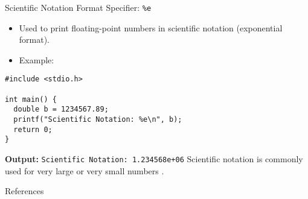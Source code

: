 \documentclass{beamer}
\begin{document}
\begin{frame}[fragile]{Scientific Notation Format Specifier: \texttt{\%e}}
  \begin{itemize}
    \item Used to print floating-point numbers in scientific notation (exponential format).
    \item Example:
  \end{itemize}
  \begin{lstlisting}
#include <stdio.h>

int main() {
  double b = 1234567.89;
  printf("Scientific Notation: %e\n", b);
  return 0;
}
  \end{lstlisting}
  \textbf{Output:} \texttt{Scientific Notation: 1.234568e+06}
  \vskip 0.5cm
  \footnotesize{Scientific notation is commonly used for very large or very small numbers \citep{knuth1973art}.}
\end{frame}


\begin{frame}[allowframebreaks]{References}
  \printbibliography
\end{frame}
\end{document}
